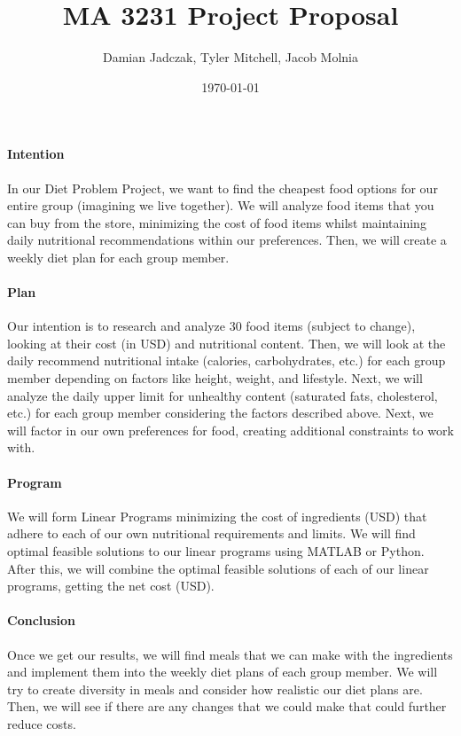 \documentclass[12pt, english]{article}
\title{MA 3231 Project Proposal}
\author{Damian Jadczak, Tyler Mitchell, Jacob Molnia}
\date\today
\begin{document}
\maketitle
\paragraph{Intention}
In our Diet Problem Project, we want to find the cheapest food options for our entire group (imagining we live together). We will analyze food items that you can buy from the store, minimizing the cost of food items whilst maintaining daily nutritional recommendations within our preferences. Then, we will create a weekly diet plan for each group member. 
\paragraph{Plan}
Our intention is to research and analyze 30 food items (subject to change), looking at their cost (in USD) and nutritional content. Then, we will look at the daily recommend nutritional intake (calories, carbohydrates, etc.) for each group member depending on factors like height, weight, and lifestyle. Next, we will analyze the daily upper limit for unhealthy content (saturated fats, cholesterol, etc.) for each group member considering the factors described above. Next, we will factor in our own preferences for food, creating additional constraints to work with. 
\paragraph{Program}
We will form Linear Programs minimizing the cost of ingredients (USD) that adhere to each of our own nutritional requirements and limits. We will find optimal feasible solutions to our linear programs using MATLAB or Python. After this, we will combine the optimal feasible solutions of each of our linear programs, getting the net cost (USD).  
\paragraph{Conclusion}
Once we get our results, we will find meals that we can make with the ingredients and implement them into the weekly diet plans of each group member. We will try to create diversity in meals and consider how realistic our diet plans are. Then, we will see if there are any changes that we could make that could further reduce costs.  
\end{document}
